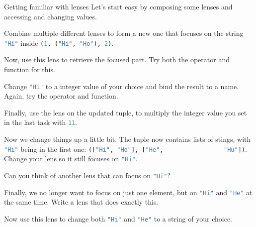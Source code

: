 \documentclass{exercise}
\newcommand\h[2][]{\lstinline[language=haskell,#1]{#2}}
\begin{document}
	\begin{exercise}{Getting familiar with lenses}
		Let's start easy by composing some lenses and accessing and changing values.
		\begin{tasks}
			\item Combine multiple different lenses to form a new one that focuses on
				the string \h{"Hi"} inside \h{(1, ("Hi", "Ho"), 2)}.
			\item Now, use this lens to retrieve the focused part. Try both the operator
				and function for this.
			\item Change \h{"Hi"} to a integer value of your choice and bind the result
				to a name. Again, try the operator and function.
			\item Finally, use the lens on the updated tuple, to multiply the integer
				value you set in the last task with \h{11}.
			\item Now we change things up a little bit. The tuple now contains lists of
				stings, with \h{"Hi"} being in the first one: \h{(["Hi", "Ho"], ["He",
				"Hu"])}. Change your lens so it still focuses on \h{"Hi"}.
			\item Can you think of another lens that can focus on \h{"Hi"}?
			\item Finally, we no longer want to focus on just one element, but on
				\h{"Hi"} and \h{"He"} at the same time. Write a lens that does exactly
				this.
			\item Now use this lens to change both \h{"Hi"} and \h{"He"} to a string of
				your choice.
		\end{tasks}
	\end{exercise}
\end{document}
